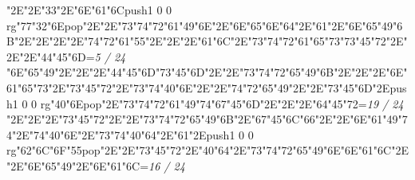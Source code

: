 \null\vfill\quad\quad\quad\ipa\char"2E\quad\quad\quad\quad\ipa\char"2E\ipa\char"33\ipa\char"2E\ipa\char"6E\ipa\char"61\ipa\char"6C\bigskip\pdfcolorstack\match push{1 0 0 rg}\ipa\char"77\ipa\char"32\ipa\char"6E\pdfcolorstack\match pop{}\ipa\char"2E\quad\quad\quad\ipa\char"2E\ipa\char"73\ipa\char"74\ipa\char"72\ipa\char"61\ipa\char"49\ipa\char"6E\bigskip\quad\quad\ipa\char"2E\ipa\char"6E\ipa\char"65\ipa\char"6E\ipa\char"64\ipa\char"2E\ipa\char"61\ipa\char"2E\ipa\char"6E\ipa\char"65\ipa\char"49\ipa\char"6B\ipa\char"2E\quad\quad\quad\ipa\char"2E\quad\quad\quad\quad\ipa\char"2E\quad\quad\quad\bigskip\quad\ipa\char"2E\ipa\char"74\ipa\char"72\ipa\char"61\ipa\char"55\ipa\char"2E\quad\quad\ipa\char"2E\quad\quad\quad\ipa\char"2E\ipa\char"61\ipa\char"6C\ipa\char"2E\ipa\char"73\ipa\char"74\ipa\char"72\ipa\char"61\ipa\char"65\ipa\char"73\bigskip\ipa\char"73\ipa\char"45\ipa\char"72\ipa\char"2E\quad\quad\ipa\char"2E\quad\quad\quad\ipa\char"2E\ipa\char"44\ipa\char"45\ipa\char"6D\bigskip\vfill\footline={\hfill\tenrm\it 5 / 24}\eject
\null\vfill\ipa\char"6E\ipa\char"65\ipa\char"49\ipa\char"2E\quad\quad\quad\quad\ipa\char"2E\quad\ipa\char"2E\ipa\char"44\ipa\char"45\ipa\char"6D\bigskip\ipa\char"73\ipa\char"45\ipa\char"6D\ipa\char"2E\quad\quad\quad\ipa\char"2E\ipa\char"73\ipa\char"74\ipa\char"72\ipa\char"65\ipa\char"49\ipa\char"6B\bigskip\quad\quad\ipa\char"2E\quad\quad\quad\quad\ipa\char"2E\quad\ipa\char"2E\ipa\char"6E\ipa\char"61\ipa\char"65\ipa\char"73\ipa\char"2E\ipa\char"73\ipa\char"45\ipa\char"72\ipa\char"2E\ipa\char"73\ipa\char"74\ipa\char"40\ipa\char"6E\ipa\char"2E\quad\quad\quad\bigskip\quad\ipa\char"2E\ipa\char"74\ipa\char"72\ipa\char"65\ipa\char"49\ipa\char"2E\quad\quad\ipa\char"2E\ipa\char"73\ipa\char"45\ipa\char"6D\ipa\char"2E\pdfcolorstack\match push{1 0 0 rg}\ipa\char"40\ipa\char"6E\pdfcolorstack\match pop{}\ipa\char"2E\ipa\char"73\ipa\char"74\ipa\char"72\ipa\char"61\ipa\char"49\ipa\char"74\bigskip\ipa\char"67\ipa\char"45\ipa\char"6D\ipa\char"2E\quad\quad\ipa\char"2E\quad\quad\quad\ipa\char"2E\ipa\char"64\ipa\char"45\ipa\char"72\bigskip\vfill\footline={\hfill\tenrm\it 19 / 24}\eject
\null\vfill\quad\quad\quad\ipa\char"2E\quad\quad\quad\quad\ipa\char"2E\quad\ipa\char"2E\quad\quad\quad\bigskip\ipa\char"73\ipa\char"45\ipa\char"72\ipa\char"2E\quad\quad\quad\ipa\char"2E\ipa\char"73\ipa\char"74\ipa\char"72\ipa\char"65\ipa\char"49\ipa\char"6B\bigskip\quad\quad\ipa\char"2E\ipa\char"67\ipa\char"45\ipa\char"6C\ipa\char"66\ipa\char"2E\quad\ipa\char"2E\ipa\char"6E\ipa\char"61\ipa\char"49\ipa\char"74\ipa\char"2E\ipa\char"74\ipa\char"40\ipa\char"6E\ipa\char"2E\ipa\char"73\ipa\char"74\ipa\char"40\ipa\char"64\ipa\char"2E\quad\quad\quad\bigskip\ipa\char"61\ipa\char"2E\pdfcolorstack\match push{1 0 0 rg}\ipa\char"62\ipa\char"6C\ipa\char"6F\ipa\char"55\pdfcolorstack\match pop{}\ipa\char"2E\quad\quad\ipa\char"2E\ipa\char"73\ipa\char"45\ipa\char"72\ipa\char"2E\ipa\char"40\ipa\char"64\ipa\char"2E\ipa\char"73\ipa\char"74\ipa\char"72\ipa\char"65\ipa\char"49\ipa\char"6E\bigskip\ipa\char"6E\ipa\char"61\ipa\char"6C\ipa\char"2E\quad\quad\ipa\char"2E\ipa\char"6E\ipa\char"65\ipa\char"49\ipa\char"2E\ipa\char"6E\ipa\char"61\ipa\char"6C\bigskip\vfill\footline={\hfill\tenrm\it 16 / 24}\eject
